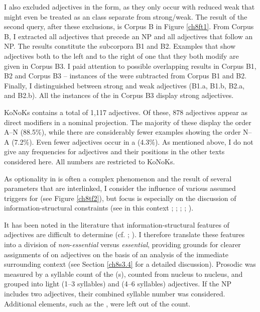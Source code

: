 \documentclass[output=paper,colorlinks,citecolor=brown]{langscibook}
\begin{document}
I also excluded adjectives in the  form, as they only occur
with reduced weak  that might even be treated as an 
class separate from strong/weak. The result of the second query, after
these exclusions, is Corpus B in Figure \ref{ch8ft1}. From Corpus B, I
extracted all adjectives that precede an NP and all adjectives that
follow an NP. The results constitute the subcorpora B1 and B2. Examples
that show adjectives both to the left and to the right of one  that
they both modify are given in Corpus B3. I paid attention to possible
overlapping results in Corpus B1, B2 and Corpus B3 -- instances of
the  were subtracted from Corpus B1 and B2. Finally, I distinguished between strong and weak adjectives (B1.a, B1.b, B2.a,
and B2.b). All the instances of the  in Corpus B3 display strong adjectives.

KoNoKs contains a total of 1,117 adjectives. Of these, 878 adjectives
appear as direct modifiers in a nominal projection. The majority of
these display the order A--N (88.5\%), while there are considerably
fewer examples showing the order N--A (7.2\%). Even fewer adjectives
occur in a  (4.3\%). As mentioned above, I do not give
any frequencies for adjectives and their positions in the other texts
considered here. All numbers are restricted to KoNoKs.

As optionality in  is often a complex phenomenon and the
result of several parameters that are interlinked, I consider the
influence of various assumed triggers for  (see Figure \ref{ch8tf2}), but
focus is especially on the discussion of information-structural
constraints (see in this context \citealp{Gundel1988}; \citealp{Bech2001}; \citealp{Petrova2009, Petrova2012}; \citealp{TaylorPintzuk2012}; \citealp{StruikvanKemenade2018}).

It has been noted in the literature that information-structural
features of adjectives are difficult to determine (cf. \citealp[13]{vanGelderenLohndal2008}; \citealp[259f]{Allen12}). I therefore translate these
features into a division of \emph{non}-\emph{essential} versus
\emph{essential}, providing grounds for clearer assignments of 
on adjectives on the basis of an analysis of the immediate surrounding
context (see Section \ref{ch8s3.4} for a detailed discussion). Prosodic 
was measured by a syllable count of the (s), counted from nucleus
to nucleus, and grouped into light (1--3 syllables) and  (4--6
syllables) adjectives. If the NP includes two adjectives, their combined
syllable number was considered. Additional elements, such as the
, were left out of the count.
\end{document}
